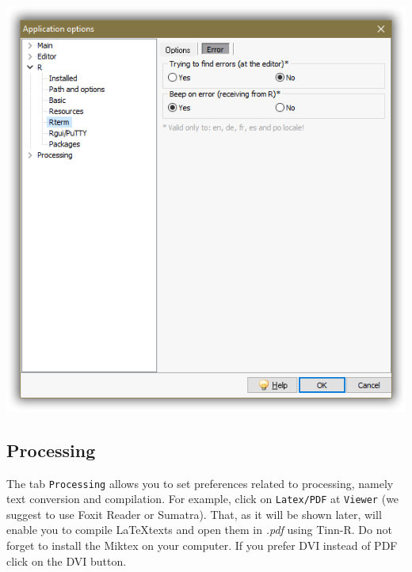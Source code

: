 \includegraphics[scale=0.50]{./res/app_r_rterm_error.png}

\subsection{Processing}

The tab \texttt{Processing} allows you to set preferences related to processing, namely text conversion and compilation.
For example, click on \texttt{Latex/PDF} at \texttt{Viewer} (we suggest to use Foxit Reader or Sumatra).
That, as it will be shown later, will enable you to compile \LaTeX texts and open them in \textit{.pdf} using Tinn-R.
Do not forget to install the Miktex on your computer. If you prefer DVI instead of PDF click on the DVI button.

